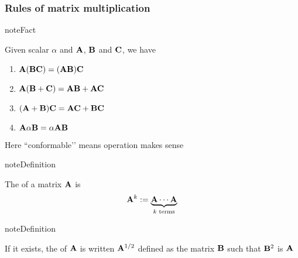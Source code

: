 \documentclass[letterpaper,10pt,english]{jupyterBook}
\begin{document}
\subsubsection{Rules of matrix multiplication}
\label{\detokenize{05.linear_algebra:rules-of-matrix-multiplication}}
\begin{sphinxadmonition}{note}{Fact}

\sphinxAtStartPar
Given scalar \(\alpha\) and  \({\bf A}\), \({\bf B}\) and \({\bf C}\), we have
\begin{enumerate}
%
\item {} 
\sphinxAtStartPar
\({\bf A} ({\bf B} {\bf C}) = ({\bf A} {\bf B}) {\bf C}\)

\item {} 
\sphinxAtStartPar
\({\bf A} ({\bf B} + {\bf C}) = {\bf A} {\bf B} + {\bf A} {\bf C}\)

\item {} 
\sphinxAtStartPar
\(({\bf A} + {\bf B}) {\bf C} = {\bf A} {\bf C} + {\bf B} {\bf C}\)

\item {} 
\sphinxAtStartPar
\({\bf A} \alpha {\bf B} = \alpha {\bf A} {\bf B}\)

\end{enumerate}
\end{sphinxadmonition}

\sphinxAtStartPar
Here ``conformable’’ means operation makes sense

\begin{sphinxadmonition}{note}{Definition}

\sphinxAtStartPar
The  of a  matrix \({\bf A}\) is
\begin{equation*}
\begin{split} {\bf A}^k := \underbrace{{\bf A} \cdots {\bf A}}_{k \text{ terms}} \end{split}
\end{equation*}\end{sphinxadmonition}

\begin{sphinxadmonition}{note}{Definition}

\sphinxAtStartPar
If it exists, the  of \({\bf A}\) is written \({\bf A}^{1/2}\)
defined as the matrix \({\bf B}\) such that \({\bf B}^2\) is \({\bf A}\)
\end{sphinxadmonition}
\end{document}
